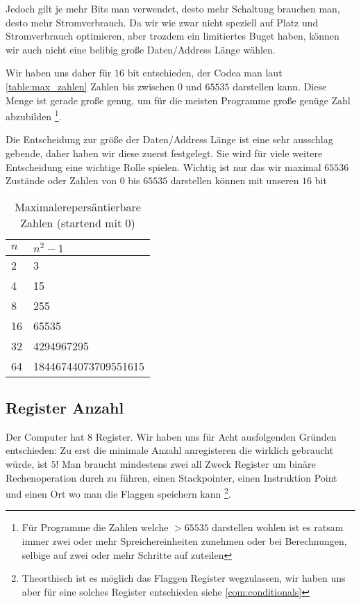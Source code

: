 \documentclass{scrartcl}
\begin{document}
Jedoch gilt je mehr Bits man verwendet, desto mehr Schaltung brauchen man, desto mehr Stromverbrauch. Da wir wie zwar nicht speziell auf Platz und Stromverbrauch optimieren, aber trozdem ein limitiertes Buget haben, können wir auch nicht eine belibig große Daten/Address Länge wählen.

Wir haben uns daher für $16$ bit entschieden, der Codea man laut \autoref{table:max_zahlen} Zahlen bis zwischen $0$ und $65535$ darstellen kann. Diese Menge ist gerade große genug, um für die meisten Programme große genüge Zahl abzubilden
\footnote{Für Programme die Zahlen welche $> 65535$ darstellen wohlen ist es ratsam immer zwei oder mehr Spreichereinheiten zunehmen oder bei Berechnungen, selbige auf zwei oder mehr Schritte auf zuteilen}.

Die Entscheidung zur größe der Daten/Address Länge ist eine sehr ausschlag gebende, daher haben wir diese zuerst festgelegt. Sie wird für viele weitere Entscheidung eine wichtige Rolle spielen. Wichtig ist nur das wir maximal $65536$ Zustände oder Zahlen von $0$ bis $65535$ darstellen können mit unseren $16$ bit

\begin{center}
	\begin{table}[h]
		\caption{\label{table:max_zahlen} Maximalerepersäntierbare Zahlen (startend mit 0)}
		\begin{tabular}{ l | l }
 		$n$ & $n^2 - 1$ \\
		\hline 
		2 & 3\\  
		4 & 15\\
		8 & 255\\
		16 & 65535\\
 		32 & 4294967295\\
 		64 & 18446744073709551615\\
		\end{tabular}
	\end{table}
\end{center}

\subsection{Register Anzahl}

Der Computer hat 8 Register. Wir haben uns für Acht ausfolgenden Gründen entschieden:
Zu erst die minimale Anzahl anregisteren die wirklich gebraucht würde, ist $5$! Man braucht mindestens zwei all Zweck Register um binäre Rechenoperation durch zu führen, einen Stackpointer, einen Instruktion Point und einen Ort wo man die Flaggen speichern kann
\footnote{Theorthisch ist es möglich das Flaggen Register wegzulassen, wir haben uns aber für eine solches Register entschieden siehe \autoref{com:conditionals}}.
\end{document}
